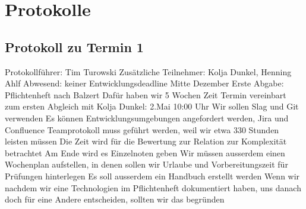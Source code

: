 \section{Protokolle}
\subsection{Protokoll zu Termin 1}
Protokollführer: Tim Turowski \newline
Zusätzliche Teilnehmer: Kolja Dunkel, Henning Ahlf \newline
Abwesend: keiner \newline \newline
Entwicklungsdeadline Mitte Dezember \newline
Erste Abgabe: Pflichtenheft nach Balzert \newline
Dafür haben wir 5 Wochen Zeit \newline
Termin vereinbart zum ersten Abgleich mit Kolja Dunkel: 2.Mai 10:00 Uhr \newline
Wir sollen Slag und Git verwenden \newline
Es können Entwicklungsumgebungen angefordert werden, Jira und Confluence \newline
Teamprotokoll muss geführt werden, weil wir etwa 330 Stunden leisten müssen \newline
Die Zeit wird für die Bewertung zur Relation zur Komplexität betrachtet \newline
Am Ende wird es Einzelnoten geben \newline
Wir müssen ausserdem einen Wochenplan aufstellen, in denen sollen wir Urlaube und Vorbereitungszeit für Prüfungen hinterlegen \newline
Es soll ausserdem ein Handbuch erstellt werden \newline
Wenn wir nachdem wir eine Technologien im Pflichtenheft dokumentiert haben, uns danach doch für eine Andere entscheiden, sollten wir das begründen 

